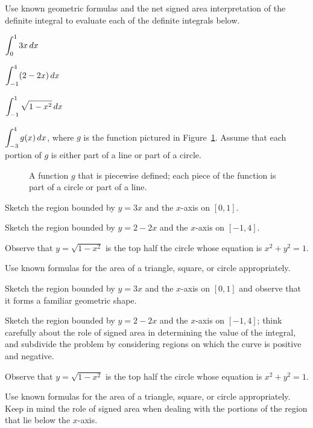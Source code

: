 \begin{activity} \label{A:4.3.1}  Use known geometric formulas and the net signed area interpretation of the definite integral to evaluate each of the definite integrals below.
\ba
	\item $\displaystyle \int_0^1 3x \, dx$
	\item $\displaystyle \int_{-1}^4 (2-2x) \, dx$
	\item $\displaystyle \int_{-1}^1 \sqrt{1-x^2} \, dx$
	\item $\displaystyle \int_{-3}^4 g(x) \, dx$, where $g$ is the function pictured in Figure~\ref{F:4.3.Act1}.  Assume that each portion of $g$ is either part of a line or part of a circle.
\ea
\begin{figure}[h]
\begin{center}
\caption{A function $g$ that is piecewise defined; each piece of the function is part of a circle or part of a line.} \label{F:4.3.Act1}
\end{center}
\end{figure}
\end{activity}
\begin{smallhint}
\ba
	\item Sketch the region bounded by $y = 3x$ and the $x$-axis on $[0,1]$.
	\item Sketch the region bounded by $y = 2-2x$ and the $x$-axis on $[-1,4]$.
	\item Observe that $y = \sqrt{1-x^2}$ is the top half the circle whose equation is $x^2 + y^2 = 1$.
	\item Use known formulas for the area of a triangle, square, or circle appropriately.
\ea
\end{smallhint}
\begin{bighint}
\ba
	\item Sketch the region bounded by $y = 3x$ and the $x$-axis on $[0,1]$ and observe that it forms a familiar geometric shape.
	\item Sketch the region bounded by $y = 2-2x$ and the $x$-axis on $[-1,4]$; think carefully about the role of signed area in determining the value of the integral, and subdivide the problem by considering regions on which the curve is positive and negative.
	\item Observe that $y = \sqrt{1-x^2}$ is the top half the circle whose equation is $x^2 + y^2 = 1$.
	\item Use known formulas for the area of a triangle, square, or circle appropriately.  Keep in mind the role of signed area when dealing with the portions of the region that lie below the $x$-axis.
\ea
\end{bighint}

